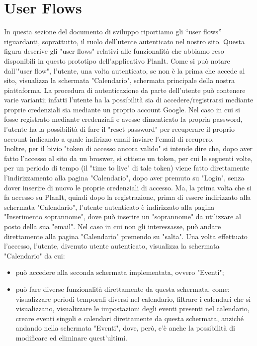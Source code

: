 \section{User Flows}
\label{secD4:UserFlows}

In questa sezione del documento di sviluppo riportiamo gli “user flows” riguardanti, soprattutto, il ruolo dell'utente autenticato nel nostro sito.
Questa figura descrive gli "user flows" relativi alle funzionalità che abbiamo reso disponibili in questo prototipo dell'applicativo PlanIt. Come si può notare dall'"user flow", l'utente, una volta autenticato, se non è la prima che accede al sito, visualizza la schermata "Calendario", schermata principale della nostra piattaforma. La procedura di autenticazione da parte dell'utente può contenere varie varianti; infatti l'utente ha la possibilità sia di accedere/registrarsi mediante proprie credenziali sia mediante un proprio account Google. Nel caso in cui si fosse registrato mediante credenziali e avesse dimenticato la propria password, l'utente ha la possibilità di fare il "reset password" per recuperare il proprio account indicando a quale indirizzo email inviare l'email di recupero. \\ Inoltre, per il bivio "token di accesso ancora valido" si intende dire che, dopo aver fatto l'accesso al sito da un broswer, si ottiene un token, per cui le seguenti volte, per un periodo di tempo (il "time to live" di tale token) viene fatto direttamente l'indirizzamento alla pagina "Calendario", dopo aver premuto su "Login", senza dover inserire di nuovo le proprie credenziali di accesso. Ma, la prima volta che si fa accesso su PlanIt, quindi dopo la registrazione, prima di essere indirizzato alla schermata "Calendario", l'utente autenticato è indirizzato alla pagina "Inserimento soprannome", dove può inserire un "soprannome" da utilizzare al posto della sua "email". Nel caso in cui non gli interessasse, può andare direttamente alla pagina "Calendario" premendo su "salta".
Una volta effettuato l'accesso, l'utente, divenuto utente autenticato, visualizza la schermata "Calendario" da cui:
\begin{itemize}
    \item può accedere alla seconda schermata implementata, ovvero "Eventi";
    \item può fare diverse funzionalità direttamente da questa schermata, come: visualizzare periodi temporali diversi nel calendario, filtrare i calendari che si visualizzano, visualizzare le impostazioni degli eventi presenti nel calendario, creare eventi singoli e calendari direttamente da questa schermata, anziché andando nella schermata "Eventi", dove, però, c'è anche la possibilità di modificare ed eliminare quest'ultimi.
    \begin{comment}
    e creare eventi ripetuti, ovvero eventi che, già in tempo di compilazione di questi, sono definiti su più giorni.
    \end{comment}
\end{itemize}
